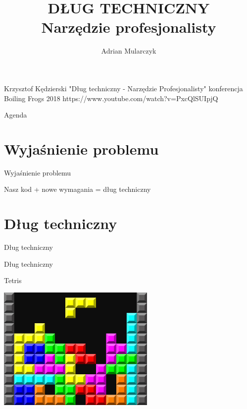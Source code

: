 \documentclass{beamer}
\title[]
{DŁUG TECHNICZNY\\
Narzędzie profesjonalisty}
\author[Adrian Mularczyk]{Adrian Mularczyk}
\institute[PGS Softwarei]
{
PGS Software
}
\date{}
\begin{document}
\begin{frame}
  \titlepage 
\end{frame}

\begin{frame}{}
\Huge{Krzysztof Kędzierski\newline\newline}
\Large{"Dług techniczny - Narzędzie Profesjonalisty"\newline\newline}
\Large{konferencja Boiling Frogs 2018\newline\newline\newline}
\Large{https://www.youtube.com/watch?v=PxcQlSUIpjQ}
\end{frame}

\begin{frame}{Agenda}
  \tableofcontents
\end{frame}

\section{Wyjaśnienie problemu}

\begin{frame}{}
\begin{center}
\Huge{Wyjaśnienie problemu}
\end{center}
\end{frame}

\begin{frame}{}
\begin{center}
\Large{Nasz kod + nowe wymagania = dług techniczny}
\end{center}
\end{frame}


\section{Dług techniczny}

\begin{frame}{Dług techniczny}
\begin{center}
\Huge{Dług techniczny}
\end{center}
\end{frame}

\begin{frame}{Tetris}
\begin{center}
  	\includegraphics[height=6cm]{tetris.jpg}
\end{center}
\end{frame}
\end{document}
